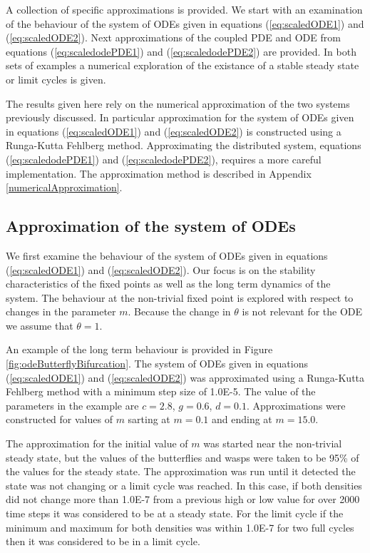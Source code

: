 \documentclass[review]{elsarticle}
\begin{document}
A collection of specific approximations is provided. We start with an
examination of the behaviour of the system of ODEs given in equations
(\ref{eq:scaledODE1}) and (\ref{eq:scaledODE2}). Next approximations
of the coupled PDE and ODE from equations (\ref{eq:scaledodePDE1}) and
(\ref{eq:scaledodePDE2}) are provided. In both sets of examples a
numerical exploration of the existance of a stable steady state or
limit cycles is given.

The results given here rely on the numerical approximation of the two
systems previously discussed. In particular approximation for the
system of ODEs given in equations (\ref{eq:scaledODE1}) and
(\ref{eq:scaledODE2}) is constructed using a Runga-Kutta Fehlberg
method. Approximating the distributed system, equations
(\ref{eq:scaledodePDE1}) and (\ref{eq:scaledodePDE2}), requires a more
careful implementation. The approximation method is described in
Appendix \ref{numericalApproximation}.

\subsection{Approximation of the system of ODEs}
\label{subsection:odeApproximation}

We first examine the behaviour of the system of ODEs given in
equations (\ref{eq:scaledODE1}) and (\ref{eq:scaledODE2}). Our focus
is on the stability characteristics of the fixed points as well as the
long term dynamics of the system. The behaviour at the non-trivial
fixed point is explored with respect to changes in the parameter
$m$. Because the change in $\theta$ is not relevant for the ODE we
assume that $\theta=1$.

An example of the long term behaviour is provided in Figure
\ref{fig:odeButterflyBifurcation}. The system of ODEs given in
equations (\ref{eq:scaledODE1}) and (\ref{eq:scaledODE2}) was
approximated using a Runga-Kutta Fehlberg method with a minimum step
size of 1.0E-5.  The value of the parameters in the example are
$c=2.8$, $g=0.6$, $d=0.1$. Approximations were constructed for values
of $m$ sarting at $m=0.1$ and ending at $m=15.0$.

The approximation for the initial value of $m$ was started near the
non-trivial steady state, but the values of the butterflies and wasps
were taken to be 95\% of the values for the steady state. The
approximation was run until it detected the state was not changing or
a limit cycle was reached. In this case, if both densities did not
change more than 1.0E-7 from a previous high or low value for over
2000 time steps it was considered to be at a steady state. For the
limit cycle if the minimum and maximum for both densities was within
1.0E-7 for two full cycles then it was considered to be in a limit
cycle.
\end{document}
